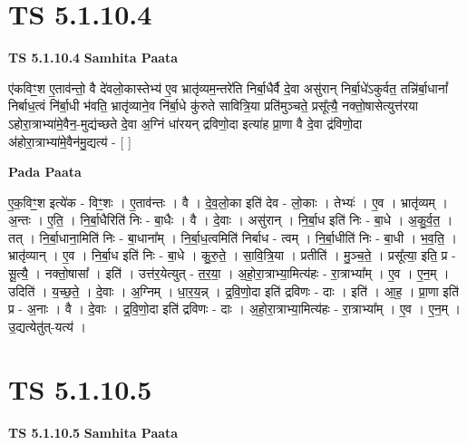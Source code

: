 \documentclass[17pt]{extarticle}
\begin{document}

\section{ TS 5.1.10.4 }

\textbf{TS 5.1.10.4 } \newline
\textbf{Samhita Paata} \newline

ए॑कविꣳ॒॒श ए॒ताव॑न्तो॒ वै दे॑वलो॒कास्तेभ्य॑ ए॒व भ्रातृ॑व्यम॒न्तरे॑ति निर्बा॒धैर्वै दे॒वा असु॑रान् निर्बा॒धे॑ऽकुर्वत॒ तन्नि॑र्बा॒धानां᳚ निर्बाध॒त्वं नि॑र्बा॒धी भ॑वति॒ भ्रातृ॑व्याने॒व नि॑र्बा॒धे कु॑रुते सावित्रि॒या प्रति॑मुञ्चते॒ प्रसू᳚त्यै॒ नक्तो॒षासेत्युत्त॑रया ऽहोरा॒त्राभ्या॑मे॒वैन॒-मुद्य॑च्छते दे॒वा अ॒ग्निं धा॑रयन् द्रविणो॒दा इत्या॑ह प्रा॒णा वै दे॒वा द्र॑विणो॒दा अ॑होरा॒त्राभ्या॑मे॒वैन॑मु॒द्यत्य॑ - [  ] \newline

\textbf{Pada Paata} \newline

ए॒क॒विꣳ॒॒श इत्ये॑क - विꣳ॒॒शः । ए॒ताव॑न्तः । वै । दे॒व॒लो॒का इति॑ देव - लो॒काः । तेभ्यः॑ । ए॒व । भ्रातृ॑व्यम् । अ॒न्तः । ए॒ति॒ । नि॒र्बा॒धैरिति॑ निः - बा॒धैः । वै । दे॒वाः । असु॑रान् । नि॒र्बा॒ध इति॑ निः - बा॒धे । अ॒कु॒र्व॒त॒ । तत् । नि॒र्बा॒धाना॒मिति॑ निः - बा॒धाना᳚म् । नि॒र्बा॒ध॒त्वमिति॑ निर्बाध - त्वम् । नि॒र्बा॒धीति॑ निः - बा॒धी । भ॒व॒ति॒ । भ्रातृ॑व्यान् । ए॒व । नि॒र्बा॒ध इति॑ निः - बा॒धे । कु॒रु॒ते॒ । सा॒वि॒त्रि॒या । प्रतीति॑ । मु॒ञ्च॒ते॒ । प्रसू᳚त्या॒ इति॒ प्र - सू॒त्यै॒ । नक्तो॒षासा᳚ । इति॑ । उत्त॑र॒येत्युत् - त॒र॒या॒ । अ॒हो॒रा॒त्राभ्या॒मित्य॑हः - रा॒त्राभ्या᳚म् । ए॒व । ए॒न॒म् । उदिति॑ । य॒च्छ॒ते॒ । दे॒वाः । अ॒ग्निम् । धा॒र॒य॒न्न् । द्र॒वि॒णो॒दा इति॑ द्रविणः - दाः । इति॑ । आ॒ह॒ । प्रा॒णा इति॑ प्र - अ॒नाः । वै । दे॒वाः । द्र॒वि॒णो॒दा इति॑ द्रविणः - दाः । अ॒हो॒रा॒त्राभ्या॒मित्य॑हः - रा॒त्राभ्या᳚म् । ए॒व । ए॒न॒म् । उ॒द्यत्येतु॑त्-यत्य॑ ।  \newline





\section{ TS 5.1.10.5 }

\textbf{TS 5.1.10.5 } \newline
\textbf{Samhita Paata} \newline
\end{document}
